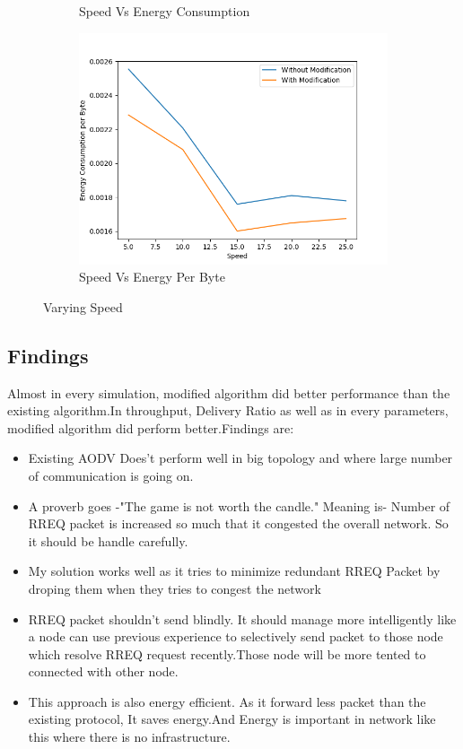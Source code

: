 \begin{figure}[h]
\begin{subfigure}{.5\textwidth}
     \caption{Speed Vs Energy Consumption}
     \label{speed_energy_modified}
\end{subfigure}
\begin{subfigure}{.5\textwidth}
  \centering
  \includegraphics[width=.8\linewidth]{modified_fig/SpeedvsEnergyConsumptionperByte.png}
     \caption{Speed Vs Energy Per Byte}
     \label{speed_energy_modified_per_byte}
\end{subfigure}
\caption{Varying Speed}
\label{fig:varyingSpeed}
\end{figure}

\subsection{Findings}
Almost in every simulation, modified algorithm did better performance than the existing algorithm.In throughput, Delivery Ratio as well as in every parameters, modified algorithm did perform better.Findings are:
\begin{itemize}
  \item Existing AODV Does't perform well in big topology and where large number of communication is going on.
  \item A proverb goes -"The game
is not worth the candle." Meaning is- Number of RREQ packet is increased so much that it congested the overall network. So it should be handle carefully.
  \item My solution works well as it tries to minimize redundant RREQ Packet by droping them when they tries to congest the network
  \item RREQ packet shouldn't send blindly. It should manage more intelligently like a node can use previous experience to selectively send packet to those node which resolve RREQ request recently.Those node will be more tented to connected with other node. 
  \item This approach is also energy efficient. As it forward less packet than the existing protocol, It saves energy.And Energy is important in network like this where there is no infrastructure.
\end{itemize}